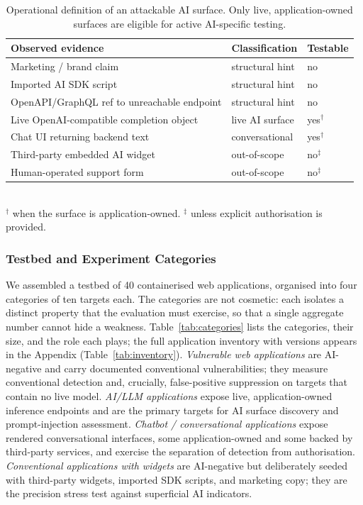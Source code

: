 \begin{table}[t]
\centering
\caption{Operational definition of an attackable AI surface. Only live,
application-owned surfaces are eligible for active AI-specific testing.}
\label{tab:surface-def}
\small
\begin{tabular}{@{}p{3.5cm}ll@{}}
\toprule
\textbf{Observed evidence} & \textbf{Classification} & \textbf{Testable} \\
\midrule
Marketing / brand claim                         & structural hint   & no \\
Imported AI SDK script                          & structural hint   & no \\
OpenAPI/GraphQL ref to unreachable endpoint     & structural hint   & no \\
Live OpenAI-compatible completion object        & live AI surface   & yes$^\dagger$ \\
Chat UI returning backend text                  & conversational    & yes$^\dagger$ \\
Third-party embedded AI widget                  & out-of-scope      & no$^\ddagger$ \\
Human-operated support form                     & out-of-scope      & no$^\ddagger$ \\
\bottomrule
\end{tabular}
\\[2pt]
{\footnotesize $^\dagger$ when the surface is application-owned.\quad
$^\ddagger$ unless explicit authorisation is provided.}
\end{table}

\subsubsection{Testbed and Experiment Categories}
\label{sec:eval:testbed}

We assembled a testbed of 40 containerised web applications, organised into
four categories of ten targets each. The categories are not cosmetic: each
isolates a distinct property that the evaluation must exercise, so that a
single aggregate number cannot hide a weakness.
Table~\ref{tab:categories} lists the categories, their size, and the role each
plays; the full application inventory with versions appears in the Appendix
(Table~\ref{tab:inventory}). \emph{Vulnerable web applications} are
AI-negative and carry documented conventional vulnerabilities; they measure
conventional detection and, crucially, false-positive suppression on targets
that contain no live model. \emph{AI/LLM applications} expose live,
application-owned inference endpoints and are the primary targets for AI
surface discovery and prompt-injection assessment. \emph{Chatbot /
conversational applications} expose rendered conversational interfaces, some
application-owned and some backed by third-party services, and exercise the
separation of detection from authorisation. \emph{Conventional applications
with widgets} are AI-negative but deliberately seeded with third-party widgets,
imported SDK scripts, and marketing copy; they are the precision stress test
against superficial AI indicators.

